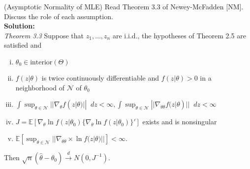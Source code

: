 \documentclass[11pt,letterpaper]{article}                  %
\newcommand*\diff{\mathop{}\!d} %
\begin{document}
\bigskip
\begin{problem} (Asymptotic Normality of MLE) Read Theorem 3.3 of Newey-McFadden [NM]. Discuss the role of each assumption. \\

\textbf{Solution:} \\

\textit{Theorem 3.3} Suppose that $z_1, \dots, z_n$ are i.i.d., the hypotheses of Theorem 2.5 are satisfied and 
\begin{enumerate}[(i)]
	\item $\theta_0 \in \text{interior}(\Theta)$
	
	\item $f(z|\theta)$ is twice continuously differentiable and $f(z|\theta) > 0$ in a neighborhood of $\mathcal{N}$ of $\theta_0$
	
	\item $\int \sup_{\theta \in \mathcal{N}} || \nabla_\theta f(z|\theta) || \diff z < \infty, \int \sup_{\theta \in \mathcal{N}} || \nabla_{\theta \theta} f(z|\theta) || \diff z < \infty$
	
	\item $J = \mathbb{E} [\nabla_\theta \ln f(z|\theta_0) \{\nabla_\theta \ln f(z|\theta_0)  \}' ]$ exists and is nonsingular
	
	\item  $ \mathbb{E} [ \sup_{\theta \in \mathcal{N}} || \nabla_{\theta \theta}  \times \ln f(z|\theta)||] < \infty$.
\end{enumerate}
Then $\sqrt{n}(\hat{\theta} - \theta_0) \xrightarrow{d} N(0, J^{-1}).$ \\
 

\end{problem}
\end{document}
